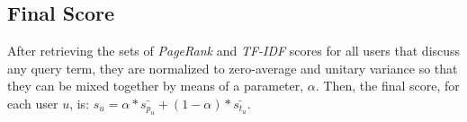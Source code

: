\subsection{Final Score}

After retrieving the sets of \emph{PageRank} and \emph{TF-IDF} scores 
for all users that discuss any query term, they are normalized to zero-average 
and unitary variance so that they can be mixed together by means of a parameter, $\alpha$. 
Then, the final score, for each user $u$, is: $s_{u} = \alpha * \bar{s_{p_{u}}} + (1 - \alpha) * \bar{s_{t_{u}}}$.